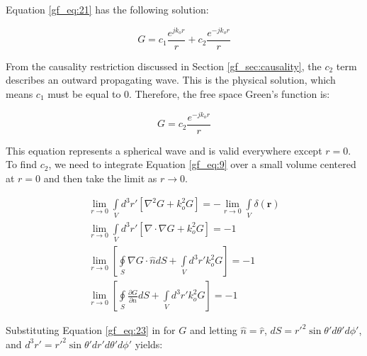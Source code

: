 Equation \ref{gf_eq:21} has the following  solution:

\begin{equation}
G = c_1\frac{e^{jk_or}}{r} + c_2\frac{e^{-jk_or}}{r}
\label{gf_eq:22}
\end{equation}
\renewcommand{\baselinestretch}{2} \small\normalsize

From the causality restriction discussed in Section \ref{gf_sec:causality}, the $c_2$ term describes an outward propagating wave. This is the physical solution, which means $c_1$ must be equal to $0$. Therefore, the free space Green's function is:

\begin{equation}
G = c_2\frac{e^{-jk_or}}{r}
\label{gf_eq:23}
\end{equation}
\renewcommand{\baselinestretch}{2} \small\normalsize

This equation represents a spherical wave and is valid everywhere except $r=0$. To find $c_2$, we need to integrate Equation \ref{gf_eq:9} over a small volume centered at $r=0$ and then take the limit as $r\rightarrow0$.

\begin{equation}
\begin{gathered}
\lim_{r\to0}\int\limits_{V}d^3r'\left[\nabla^2G+ k_o^2G\right] = -\lim_{r\to0}\int\limits_{V}\delta\left(\mathbf{r}\right) \\
\lim_{r\to0}\int\limits_{V}d^3r'\left[\nabla \cdot\nabla G+ k_o^2G\right] = -1 \\
\lim_{r\to0}\left[\oint\limits_{S}\nabla G \cdot \hat{n} dS + \int\limits_{V}d^3r' k_o^2G\right] = -1 \\
\lim_{r\to0}\left[\oint\limits_{S}\frac{\partial G}{\partial n} dS + \int\limits_{V}d^3r' k_o^2G\right] = -1
\end{gathered}
\label{gf_eq:24}
\end{equation}
\renewcommand{\baselinestretch}{2} \small\normalsize

Substituting Equation \ref{gf_eq:23} in for $G$ and letting $\hat{n} = \hat{r}$, $dS = r'^2\sin{\theta'}d\theta' d\phi'$, and  $d^3r' = r'^2\sin{\theta'}dr'd\theta' d\phi'$ yields:

